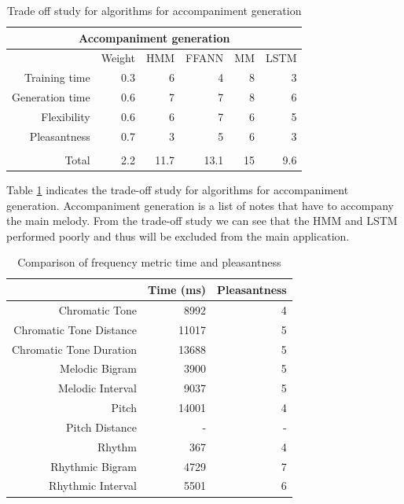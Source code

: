 \begin{table}[htbp]
  \centering
  \caption{Trade off study for algorithms for accompaniment generation}
    \begin{tabular}{rr|rrrr}
    \toprule
    \multicolumn{6}{c}{Accompaniment generation} \\
    \midrule
          & Weight & HMM   & FFANN & MM    & LSTM \\
    \midrule  
    Training time & 0.3   & 6     & 4     & 8     & 3 \\
    Generation time & 0.6   & 7     & 7     & 8     & 6 \\
    Flexibility & 0.6   & 6     & 7     & 6     & 5 \\
    Pleasantness & 0.7   & 3     & 5     & 6     & 3 \\
          &       &       &       &       &  \\
          \bottomrule
    Total & 2.2   & 11.7  & 13.1  & 15    & 9.6 \\
    \bottomrule
    \end{tabular}%
  \label{tab:toaccompgen}%
\end{table}%

Table \ref{tab:toaccompgen} indicates the trade-off study for algorithms for accompaniment generation. Accompaniment generation is a list of notes that have to accompany the main melody. From the trade-off study we can see that the \ac{HMM} and \ac{LSTM} performed poorly and thus will be excluded from the main application.

\begin{table}[htbp]
  \centering
  \caption{Comparison of frequency metric time and pleasantness}
    \begin{tabular}{r|rr}
    \toprule
          & Time (ms) & Pleasantness \\
    \midrule
    Chromatic Tone & 8992  & 4 \\
    Chromatic Tone Distance & 11017 & 5 \\
    Chromatic Tone Duration & 13688 & 5 \\
    Melodic Bigram & 3900  & 5 \\
    Melodic Interval & 9037  & 5 \\
    Pitch & 14001 & 4 \\
    Pitch Distance & -     & - \\
    Rhythm & 367   & 4 \\
    Rhythmic Bigram & 4729  & 7 \\
    Rhythmic Interval & 5501  & 6 \\
    \bottomrule
    \end{tabular}%
  \label{tab:fmetrictimepleasant}%
\end{table}%


